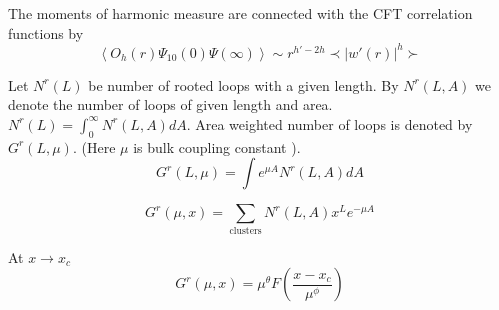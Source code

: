 \documentclass[12pt]{article}
\begin{document}
The moments of harmonic measure are connected with the CFT correlation functions by
\begin{equation}
  \label{eq:118}
  \left<O_{h}(r) \Psi_{10}(0)\Psi(\infty)\right>\sim r^{h'-2h}\prec |w'(r)|^{h}\succ
\end{equation}







Let $N^r(L)$ be number of rooted loops with a given length. By $N^r(L,A)$ we denote the number of
loops of given length and area. $N^r(L)=\int_0^{\infty} N^r(L,A) dA$. Area weighted number of loops
is denoted by $G^r(L,\mu)$. (Here $\mu$ is bulk coupling constant ).
\begin{equation}
  \label{eq:2}
  G^r(L,\mu)=\int e^{\mu A} N^r(L,A) dA
\end{equation}

\begin{equation}
  \label{eq:1}
  G^r (\mu,x) = \sum_{\mathrm{clusters}} N^r (L,A) x^L e^{-\mu A}
\end{equation}

At $x\to x_c$
\begin{equation}
  \label{eq:6}
  G^r(\mu,x)= \mu^{\theta} F\left(\frac{x-x_c}{\mu^{\phi}}\right)
\end{equation}
\end{document}
